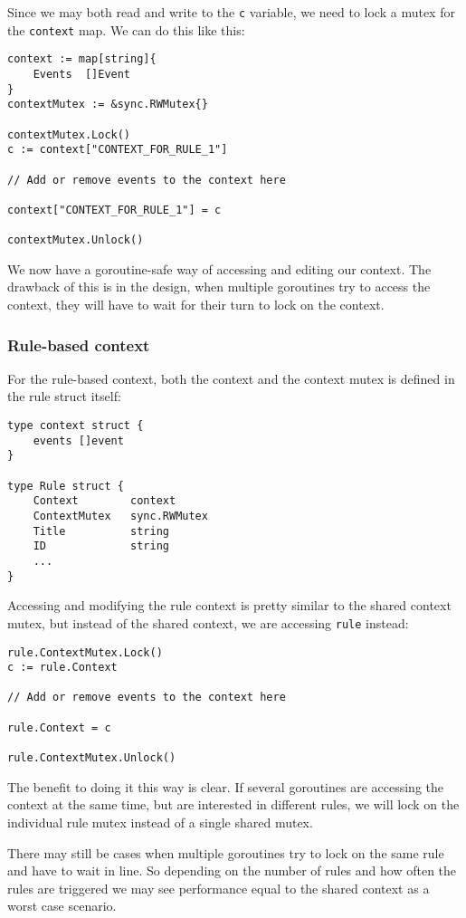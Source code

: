 Since we may both read and write to the \lstinline{c} variable, we need to lock a mutex for the \lstinline{context} map. We can do this like this:

\begin{lstlisting}
context := map[string]{
    Events  []Event
}
contextMutex := &sync.RWMutex{}

contextMutex.Lock()
c := context["CONTEXT_FOR_RULE_1"]

// Add or remove events to the context here

context["CONTEXT_FOR_RULE_1"] = c

contextMutex.Unlock()
\end{lstlisting}

We now have a goroutine-safe way of accessing and editing our context. The drawback of this is in the design, when multiple goroutines try to access the context, they will have to wait for their turn to lock on the context.

\subsubsection{Rule-based context}
For the rule-based context, both the context and the context mutex is defined in the rule struct itself:
\begin{lstlisting}
type context struct {
    events []event
}

type Rule struct {
	Context        context
	ContextMutex   sync.RWMutex
	Title          string
	ID             string
	...
}
\end{lstlisting}
Accessing and modifying the rule context is pretty similar to the shared context mutex, but instead of the shared context, we are accessing \lstinline{rule} instead:
\begin{lstlisting}
rule.ContextMutex.Lock()
c := rule.Context

// Add or remove events to the context here

rule.Context = c

rule.ContextMutex.Unlock()
\end{lstlisting}


The benefit to doing it this way is clear. If several goroutines are accessing the context at the same time, but are interested in different rules, we will lock on the individual rule mutex instead of a single shared mutex.

There may still be cases when multiple goroutines try to lock on the same rule and have to wait in line. So depending on the number of rules and how often the rules are triggered we may see performance equal to the shared context as a worst case scenario.
